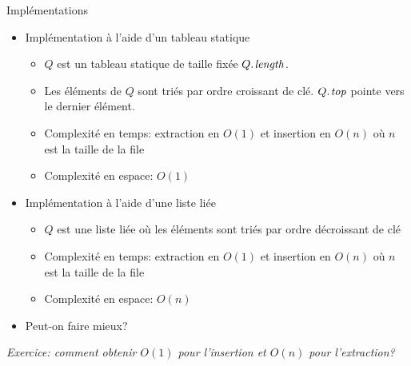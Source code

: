 \begin{frame}{Implémentations}
\begin{itemize}
\item Implémentation à l'aide d'un tableau statique
\begin{itemize}
\item $Q$ est un tableau statique de taille fixée $\attrib{Q}{length}$.
\item Les éléments de $Q$ sont triés par ordre \alert{croissant} de clé. $\attrib{Q}{top}$ pointe vers le dernier élément.
\item Complexité en temps: extraction en $O(1)$ et insertion en $O(n)$ où $n$ est la taille de la file
\item Complexité en espace: $O(1)$
\end{itemize}
\item Implémentation à l'aide d'une liste liée
\begin{itemize}
\item $Q$ est une liste liée où les éléments sont triés par ordre \alert{décroissant} de clé
\item Complexité en temps: extraction en $O(1)$ et insertion en $O(n)$ où $n$ est la taille de la file
\item Complexité en espace: $O(n)$
\end{itemize}
\item Peut-on faire mieux?
\end{itemize}

{\it Exercice: comment obtenir $O(1)$ pour l'insertion et $O(n)$ pour l'extraction?}
\end{frame}

